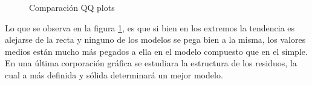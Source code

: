 \begin{figure}[h]
\centering
{}%
\hspace{0.25cm}%
\caption{Comparación QQ plots}
\label{qqplots_comparativa}
\end{figure}




Lo que se observa en la figura \ref{qqplots_comparativa}, es que si bien en los extremos la tendencia es alejarse de la recta y ninguno de los modelos se pega bien a la misma, los valores medios están mucho más pegados a ella en el modelo compuesto que en el simple. \\

En una última corporación gráfica se estudiara la estructura de los residuos, la cual a más definida y sólida determinará un mejor modelo.



